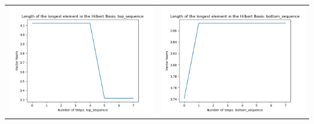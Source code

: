 \documentclass[10pt]{article}
\begin{document}
\begin{tabular}{c|c}
\begin{minipage}{.45\textwidth}
\includegraphics[width=\textwidth]{"DATA/5d/5 generators 2 bound A/top_sequence LENGTH"}
\end{minipage} &
\begin{minipage}{.45\textwidth}
\includegraphics[width=\textwidth]{"DATA/5d/5 generators 2 bound A bottomup/bottom_sequence LENGTH"}
\end{minipage}
\end{tabular}
\end{document}
